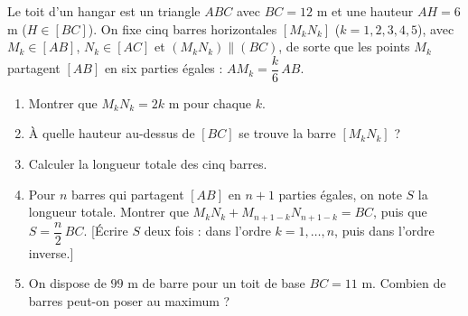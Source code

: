 
Le toit d'un hangar est un triangle $ABC$ avec $BC=12$ m et une hauteur $AH=6$ m ($H\in[BC]$). On fixe cinq barres horizontales $[M_kN_k]$ ($k=1,2,3,4,5$), avec $M_k\in[AB]$, $N_k\in[AC]$ et $(M_kN_k)\parallel(BC)$, de sorte que les points $M_k$ partagent $[AB]$ en six parties égales : $AM_k=\dfrac k6\,AB$.
\begin{center}
\end{center}
\begin{enumerate}
  \item Montrer que $M_kN_k=2k$ m pour chaque $k$.
  \item À quelle hauteur au-dessus de $[BC]$ se trouve la barre $[M_kN_k]$ ?
  \item Calculer la longueur totale des cinq barres.
  \item Pour $n$ barres qui partagent $[AB]$ en $n+1$ parties égales, on note $S$ la longueur totale. Montrer que $M_kN_k+M_{n+1-k}N_{n+1-k}=BC$, puis que $S=\dfrac n2\,BC$. [Écrire $S$ deux fois : dans l'ordre $k=1,\dots,n$, puis dans l'ordre inverse.]
  \item On dispose de $99$ m de barre pour un toit de base $BC=11$ m. Combien de barres peut-on poser au maximum ?
\end{enumerate}

